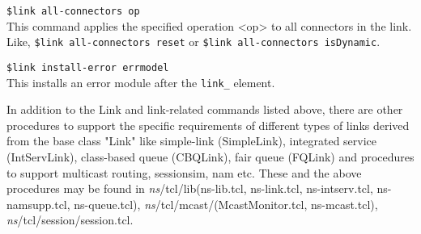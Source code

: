 \begin{flushleft}
{\tt \$link all-connectors op}\\ 
This command applies the specified operation <op> to all connectors in the
link.  Like, {\tt \$link all-connectors reset} or
{\tt \$link all-connectors isDynamic}. 


{\tt \$link install-error \<errmodel\>}\\
This installs an error module after the {\tt link\_} element.


In addition to the Link and link-related commands listed above, there are
other procedures to support the specific requirements of different types of
links derived from the base class "Link" like simple-link (SimpleLink),
integrated service (IntServLink), class-based queue (CBQLink), fair queue
(FQLink) and procedures to support multicast routing, sessionsim, nam etc.
These and the above procedures may be found in \emph{ns}/tcl/lib(ns-lib.tcl,
ns-link.tcl, ns-intserv.tcl, ns-namsupp.tcl, ns-queue.tcl),
\emph{ns}/tcl/mcast/(McastMonitor.tcl, ns-mcast.tcl), 
\emph{ns}/tcl/session/session.tcl.

\end{flushleft}
